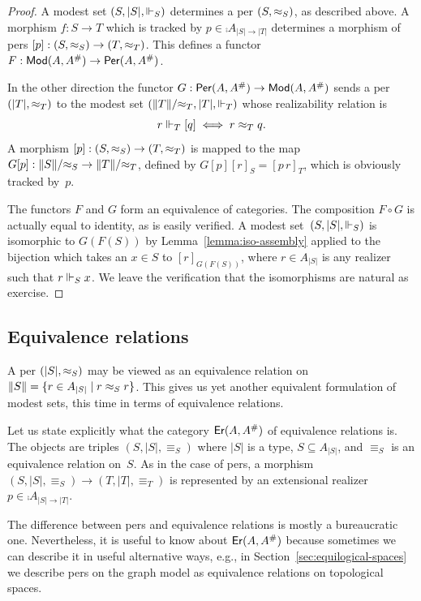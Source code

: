 \begin{proof}
  A modest set $(S, |S|, {\Vdash_S})$ determines a per $(S, {\approx_S})$,
  as described above. A morphism $f : S \to T$ which is tracked by $p
  \in \comp{A}_{|S| \to |T|}$ determines a morphism of pers $[p] : (S,
  {\approx_S}) \to (T, {\approx_T})$. This defines a functor $F : \mathsf{Mod}(A,
    A^{\#}) \to \mathsf{Per}(A, A^{\#})$.

  In the other direction the functor $G : \mathsf{Per}(A, A^{\#}) \to
  \mathsf{Mod}(A, A^{\#})$ sends a per $(|T|, {\approx_T})$ to the modest set
  $(\|T\|/{\approx_T}, |T|, {\Vdash_T})$ whose realizability relation is
  \begin{equation*}
    r \Vdash_T [q] \iff r \approx_T q.
  \end{equation*}
  A morphism $[p] : (S, {\approx_S}) \to (T, {\approx_T})$ is mapped to the
  map $G [p] : \|S\|/{\approx_S} \to \|T\|/{\approx_T}$, defined by $G [p]
  [r]_S = [p\,r]_T$, which is obviously tracked by~$p$.

  The functors $F$ and $G$ form an equivalence of categories. The
  composition $F \circ G$ is actually equal to identity, as is easily
  verified. A modest set~$(S, |S|, {\Vdash_S})$ is isomorphic to
  $G(F(S))$ by Lemma~\ref{lemma:iso-assembly} applied to the bijection
  which takes an $x \in S$ to $[r]_{G(F(S))}$, where $r \in A_{|S|}$
  is any realizer such that $r \Vdash_S x$. We leave the verification
  that the isomorphisms are natural as exercise.
\end{proof}


\subsection{Equivalence relations}
\label{sec:ers}

A per $(|S|, {\approx_S})$ may be viewed as an equivalence relation on
$\|S\| = \{r \in A_{|S|} \mid r \approx_S r\}$. This gives us yet
another equivalent formulation of modest sets, this time in terms of
equivalence relations.

Let us state explicitly what the category $\mathsf{Er}(A, A^{\#})$ of
equivalence relations is. The objects are triples $(S, |S|,
{\equiv_S})$ where $|S|$ is a type, $S \subseteq A_{|S|}$, and
$\equiv_S$ is an equivalence relation on~$S$. As in the case of pers,
a morphism $(S, |S|, {\equiv_S}) \to (T, |T|, {\equiv_T})$ is
represented by an extensional realizer $p \in \comp{A}_{|S| \to |T|}$.

The difference between pers and equivalence relations is mostly a
bureaucratic one. Nevertheless, it is useful to know about $\mathsf{Er}(A,
  A^{\#})$ because sometimes we can describe it in useful
alternative ways, e.g., in Section~\ref{sec:equilogical-spaces} we
describe pers on the graph model as equivalence relations on
topological spaces.


